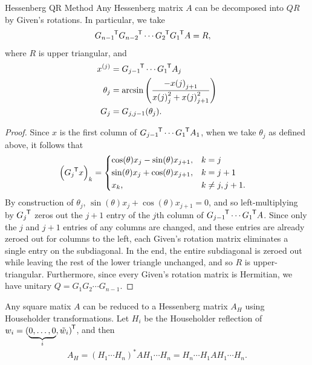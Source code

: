 \begin{thm}{Hessenberg QR Method}\proofbreak
    Any Hessenberg matrix $A$ can be decomposed into $QR$ by Given's rotations. In particular, we take
    \begin{align*}
        {G_{n-1}}^{\mkern-1.5mu\mathsf{T}}{G_{n-2}}^{\mkern-1.5mu\mathsf{T}}\cdots {G_{2}}^{\mkern-1.5mu\mathsf{T}}{G_{1}}^{\mkern-1.5mu\mathsf{T}}A &= R,
    \end{align*}
    where $R$ is upper triangular, and
    \begin{align*}
        x^{(j)} &= {G_{j-1}}^{\mkern-1.5mu\mathsf{T}}\cdots{G_{1}}^{\mkern-1.5mu\mathsf{T}}A_{j} \\
        \theta_j &= \arcsin\left(\frac{-x{(j)}_{j+1}}{x{(j)}_{j}^2+x{(j)}_{j+1}^2}\right)\\
        G_{j} &= G_{j,j-1}(\theta_j).
    \end{align*}
\end{thm}

\begin{proof}
    Since $x$ is the first column of ${G_{j-1}}^{\mkern-1.5mu\mathsf{T}}\cdots{G_{1}}^{\mkern-1.5mu\mathsf{T}}A_{1}$, when we take $\theta_j$ as defined above, it follows that
    \begin{align*}
        \left({G_{j}}^{\mkern-1.5mu\mathsf{T}}x\right)_k &= \begin{dcases}
            \cos(\theta)x_j - \sin(\theta)x_{j+1}, &k=j \\
            \sin(\theta)x_j + \cos(\theta)x_{j+1}, &k=j+1 \\
            x_k, &k\neq j,j+1.
        \end{dcases}
    \end{align*}
    By construction of $\theta_j$, $\sin(\theta)x_j + \cos(\theta)x_{j+1} = 0$, and so left-multiplying by ${G_{j}}^{\mkern-1.5mu\mathsf{T}}$ zeros out the $j+1$ entry of the $j$th column of ${G_{j-1}}^{\mkern-1.5mu\mathsf{T}}\cdots{G_1}^{\mkern-1.5mu\mathsf{T}}A$. Since only the $j$ and $j+1$ entries of any columns are changed, and these entries are already zeroed out for columns to the left, each Given's rotation matrix eliminates a single entry on the subdiagonal. In the end, the entire subdiagonal is zeroed out while leaving the rest of the lower triangle unchanged, and so $R$ is upper-triangular. Furthermore, since every Given's rotation matrix is Hermitian, we have unitary $Q = G_1G_2\cdots G_{n-1}$.
\end{proof}

\begin{thm}
    Any square matix $A$ can be reduced to a Hessenberg matrix $A_H$ using Householder transformations. Let $H_i$ be the Householder reflection of $w_i = {(\underbrace{0, \ldots, 0}_{i}, \tilde{w}_i)}^{\mkern-1.5mu\mathsf{T}}$, and then
    \begin{align*}
        A_H = \left(H_1 \cdots H_n\right)^{*}A H_1 \cdots H_n = H_n \cdots H_1 A H_1 \cdots H_n.
    \end{align*}
\end{thm}

